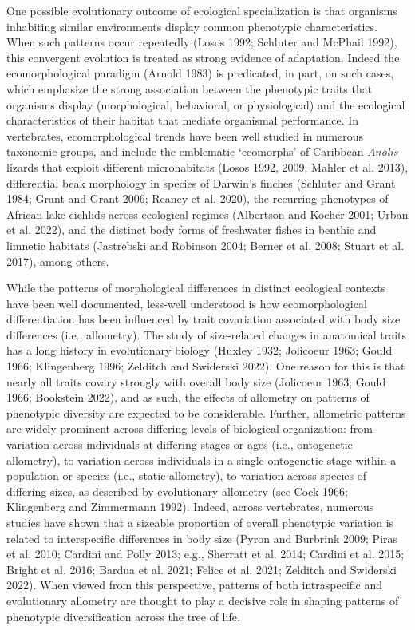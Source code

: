 \documentclass[
  11pt,
]{article}
\begin{document}
One possible evolutionary outcome of ecological specialization is that
organisms inhabiting similar environments display common phenotypic
characteristics. When such patterns occur repeatedly (Losos 1992;
Schluter and McPhail 1992), this convergent evolution is treated as
strong evidence of adaptation. Indeed the ecomorphological paradigm
(Arnold 1983) is predicated, in part, on such cases, which emphasize the
strong association between the phenotypic traits that organisms display
(morphological, behavioral, or physiological) and the ecological
characteristics of their habitat that mediate organismal performance. In
vertebrates, ecomorphological trends have been well studied in numerous
taxonomic groups, and include the emblematic `ecomorphs' of Caribbean
\emph{Anolis} lizards that exploit different microhabitats (Losos 1992,
2009; Mahler et al. 2013), differential beak morphology in species of
Darwin's finches (Schluter and Grant 1984; Grant and Grant 2006; Reaney
et al. 2020), the recurring phenotypes of African lake cichlids across
ecological regimes (Albertson and Kocher 2001; Urban et al. 2022), and
the distinct body forms of freshwater fishes in benthic and limnetic
habitats (Jastrebski and Robinson 2004; Berner et al. 2008; Stuart et
al. 2017), among others. \hfill\break

While the patterns of morphological differences in distinct ecological
contexts have been well documented, less-well understood is how
ecomorphological differentiation has been influenced by trait
covariation associated with body size differences (i.e., allometry). The
study of size-related changes in anatomical traits has a long history in
evolutionary biology (Huxley 1932; Jolicoeur 1963; Gould 1966;
Klingenberg 1996; Zelditch and Swiderski 2022). One reason for this is
that nearly all traits covary strongly with overall body size (Jolicoeur
1963; Gould 1966; Bookstein 2022), and as such, the effects of allometry
on patterns of phenotypic diversity are expected to be considerable.
Further, allometric patterns are widely prominent across differing
levels of biological organization: from variation across individuals at
differing stages or ages (i.e., ontogenetic allometry), to variation
across individuals in a single ontogenetic stage within a population or
species (i.e., static allometry), to variation across species of
differing sizes, as described by evolutionary allometry (see Cock 1966;
Klingenberg and Zimmermann 1992). Indeed, across vertebrates, numerous
studies have shown that a sizeable proportion of overall phenotypic
variation is related to interspecific differences in body size (Pyron
and Burbrink 2009; Piras et al. 2010; Cardini and Polly 2013; e.g.,
Sherratt et al. 2014; Cardini et al. 2015; Bright et al. 2016; Bardua et
al. 2021; Felice et al. 2021; Zelditch and Swiderski 2022). When viewed
from this perspective, patterns of both intraspecific and evolutionary
allometry are thought to play a decisive role in shaping patterns of
phenotypic diversification across the tree of life. \hfill\break
\end{document}

